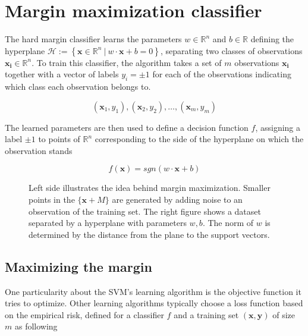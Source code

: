\section {Margin maximization classifier}

The hard margin classifier learns the parameters $w \in \mathbb{R}^n$ and $b \in \mathbb{R}$ defining the hyperplane $\mathscr{H} := \left\{ \mathbf{x} \in \mathbb{R}^n\ |\ w \cdot \mathbf{x} + b = 0\right\}$, separating two classes of observations $\mathbf{x_i} \in \mathbb{R}^n$. To train this classifier, the algorithm takes a set of $m$ observations $\mathbf{x_i}$ together with a vector of labels $y_i = \pm 1$ for each of the observations indicating which class each observation belongs to. 

\begin{equation*}
(\mathbf{x}_1, y_1), (\mathbf{x}_2, y_2), \dotsc, (\mathbf{x}_m, y_m)
\end{equation*}

The learned parameters are then used to define a decision function $f$, assigning a label $\pm 1$ to points of $\mathbb{R}^n$ corresponding to the side of the hyperplane on which the observation stands

\begin{equation}
  f(\mathbf{x}) = sgn(w \cdot \mathbf{x} + b)
\end{equation}

\begin{figure*}
  \begin{minipage}{.5\textwidth}
    \centering
    
  \end{minipage}%
  \begin{minipage}{.5\textwidth}
    \centering
    
  \end{minipage}

  \caption{
    Left side illustrates the idea behind margin maximization. Smaller points in the $\{ \mathbf{x} + M \}$ are generated by adding noise to an observation of the training set. The right figure shows a dataset separated by a hyperplane with parameters $w, b$. The norm of $w$ is determined by the distance from the plane to the support vectors.
  }
\end{figure*}

\subsection {Maximizing the margin}

One particularity about the SVM's learning algorithm is the objective function it tries to optimize. Other learning algorithms typically choose a loss function based on the empirical risk, defined for a classifier $f$ and a training set $(\mathbf{x}, \mathbf{y})$ of size $m$ as following

